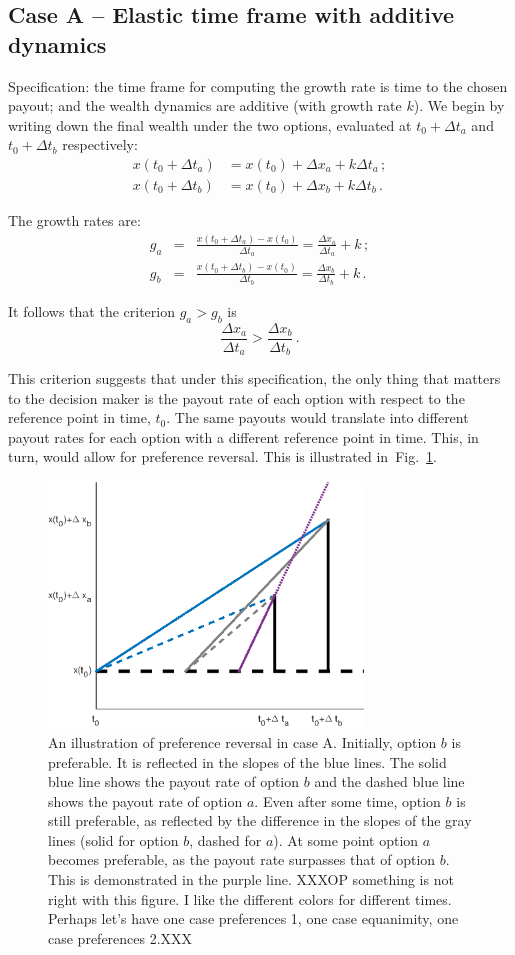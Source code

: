 \documentclass[11pt]{article}
\newcommand{\flabel}[1]{\label{fig:#1}}
\newcommand{\fref}[1]{Fig.~\ref{fig:#1}}
\newcommand{\be}{\begin{equation}}
\newcommand{\ee}{\end{equation}}
\newcommand{\bea}{\begin{eqnarray}}
\newcommand{\eea}{\end{eqnarray}}
\newcommand{\Dt}{\Delta t}
\newcommand{\Dx}{\Delta x}
\numberwithin{equation}{section}
\begin{document}
\subsection{Case A -- Elastic time frame with additive dynamics}\label{sec:case_A}

Specification: the time frame for computing the growth rate is time to the chosen payout; and the wealth dynamics are additive (with growth rate $k$). We begin by writing down the final wealth under the two options, evaluated at $t_0+\Dt_a$ and $t_0+\Dt_b$ respectively:
\bea
x\left(t_0+\Dt_a\right) &= x\left(t_0\right) + \Dx_a + k \Dt_a\,;\\
x\left(t_0+\Dt_b\right) &= x\left(t_0\right) + \Dx_b + k \Dt_b\,.
\eea

The growth rates are:
\bea
g_a &=& \frac{x\left(t_0+\Dt_a\right) - x\left(t_0\right)}{\Dt_a} = \frac{\Dx_a}{\Dt_a} + k\,;\\
g_b &=& \frac{x\left(t_0+\Dt_b\right) - x\left(t_0\right)}{\Dt_b} = \frac{\Dx_b}{\Dt_b} + k\,.
\eea

It follows that the criterion $g_a > g_b$ is
\be
\frac{\Dx_a}{\Dt_a} > \frac{\Dx_b}{\Dt_b}\,.
\ee

This criterion suggests that under this specification, the only thing that matters to the decision maker is the payout rate of each option with respect to the reference point in time, $t_0$. The same payouts would translate into different payout rates for each option with a different reference point in time. This, in turn, would allow for preference reversal. This is illustrated in~\fref{caseA}.

\begin{figure}[!htb]
\centering
\includegraphics[width=0.75\textwidth]{./figures/case_A.eps}
\caption{An illustration of preference reversal in case A. Initially, option $b$ is preferable. It is reflected in the slopes of the blue lines. The solid blue line shows the payout rate of option $b$ and the dashed blue line shows the payout rate of option $a$. Even after some time, option $b$ is still preferable, as reflected by the difference in the slopes of the gray lines (solid for option $b$, dashed for $a$). At some point option $a$ becomes preferable, as the payout rate surpasses that of option $b$. This is demonstrated in the purple line.
XXXOP something is not right with this figure. I like the different colors for different times. Perhaps let's have one case preferences 1, one case equanimity, one case preferences 2.XXX}
\flabel{caseA}
\end{figure}
\end{document}
